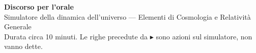 \documentclass[12pt,a4paper]{article}
\begin{document}
\begin{center}
{\Large\bfseries Discorso per l'orale}\\[3pt]
Simulatore della dinamica dell'universo --- Elementi di Cosmologia e Relatività Generale\\[2pt]
\small Durata circa 10 minuti. Le righe precedute da {\color{blu}$\blacktriangleright$} sono azioni sul simulatore, non vanno dette.
\end{center}

\end{document}
